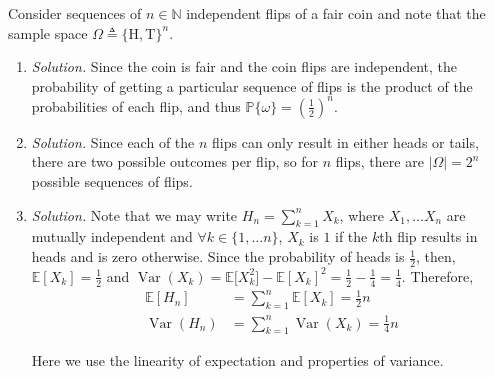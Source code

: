 \documentclass{article}
\numberwithin{equation}{section}
\begin{document}
Consider sequences of $ n \in \mathbb{N} $ independent flips of a fair coin
and note that the sample space $ \Omega \triangleq \{\text{H}, \text{T}\}^n $.
\begin{enumerate}[label = \alph*.]
    \item
    \textit{Solution.} Since the coin is fair and the coin flips are
    independent, the probability of getting a particular sequence of flips is
    the product of the probabilities of each flip, and thus
    $ \mathbb{P}\{\omega\} = \left(\frac{1}{2}\right)^n $.

    \item
    \textit{Solution.} Since each of the $ n $ flips can only result in either
    heads or tails, there are two possible outcomes per flip, so for $ n $
    flips, there are $ |\Omega| = 2^n $ possible sequences of flips.

    \item
    \textit{Solution.} Note that we may write $ H_n = \sum_{k = 1}^nX_k $,
    where $ X_1, \ldots X_n $ are mutually independent and
    $ \forall k \in \{1, \ldots n\} $, $ X_k $ is $ 1 $ if the $ k $th flip
    results in heads and is zero otherwise. Since the probability of heads is
    $ \frac{1}{2} $, then, $ \mathbb{E}[X_k] = \frac{1}{2} $ and
    $ \operatorname{Var}(X_k) = \mathbb{E}\big[X_k^2\big] - \mathbb{E}[X_k]^2 = \frac{1}{2} - \frac{1}{4} = \frac{1}{4} $. Therefore,
    \begin{equation*}
        \begin{split}
        \mathbb{E}[H_n] & = \sum_{k = 1}^n\mathbb{E}[X_k] = \frac{1}{2}n \\
        \operatorname{Var}(H_n) & = \sum_{k = 1}^n\operatorname{Var}(X_k) =
            \frac{1}{4}n
        \end{split}
    \end{equation*}

    Here we use the linearity of expectation and properties of variance.
\end{enumerate}
\end{document}
